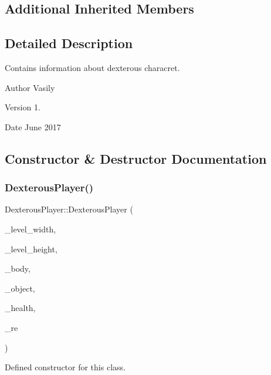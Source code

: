 \subsection*{Additional Inherited Members}


\subsection{Detailed Description}
Contains information about dexterous characret. 

\begin{DoxyAuthor}{Author}
Vasily 
\end{DoxyAuthor}
\begin{DoxyVersion}{Version}
1. 
\end{DoxyVersion}
\begin{DoxyDate}{Date}
June 2017 
\end{DoxyDate}


\subsection{Constructor \& Destructor Documentation}
\mbox{\label{class_dexterous_player_a852e50ce93cf01a9b042e58a6bcf2e4e}} 
\subsubsection{\texorpdfstring{Dexterous\+Player()}{DexterousPlayer()}}
{\footnotesize\ttfamily Dexterous\+Player\+::\+Dexterous\+Player (\begin{DoxyParamCaption}\item[{int}]{\+\_\+level\+\_\+width,  }\item[{int}]{\+\_\+level\+\_\+height,  }\item[{b2\+Body $\ast$}]{\+\_\+body,  }\item[{\hyperlink{class_object}{Object} $\ast$}]{\+\_\+object,  }\item[{int}]{\+\_\+health,  }\item[{Return\+Events $\ast$}]{\+\_\+re }\end{DoxyParamCaption})}



Defined constructor for this class. 


